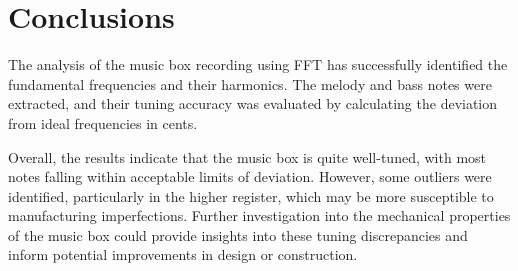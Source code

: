 \chapter{Conclusions}

The analysis of the music box recording using FFT has successfully identified the fundamental frequencies and their harmonics. The melody and bass notes were extracted, and their tuning accuracy was evaluated by calculating the deviation from ideal frequencies in cents.

Overall, the results indicate that the music box is quite well-tuned, with most notes falling within acceptable limits of deviation. However, some outliers were identified, particularly in the higher register, which may be more susceptible to manufacturing imperfections. Further investigation into the mechanical properties of the music box could provide insights into these tuning discrepancies and inform potential improvements in design or construction.

